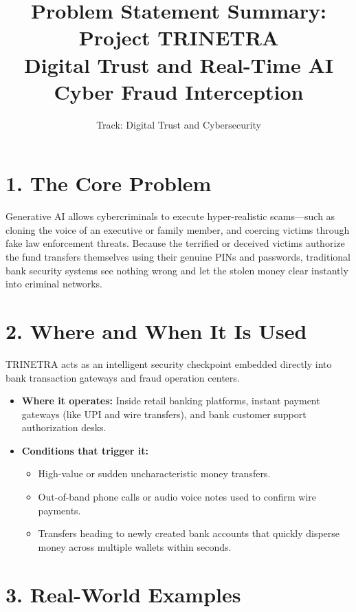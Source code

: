\documentclass[11pt,a4paper]{article}
\title{\textbf{Problem Statement Summary: Project TRINETRA}\\\large Digital Trust and Real-Time AI Cyber Fraud Interception}
\author{Track: Digital Trust and Cybersecurity}
\date{}
\begin{document}
\maketitle

\section*{1. The Core Problem}
Generative AI allows cybercriminals to execute hyper-realistic scams—such as cloning the voice of an executive or family member, and coercing victims through fake law enforcement threats. Because the terrified or deceived victims authorize the fund transfers themselves using their genuine PINs and passwords, traditional bank security systems see nothing wrong and let the stolen money clear instantly into criminal networks.

\section*{2. Where and When It Is Used}
TRINETRA acts as an intelligent security checkpoint embedded directly into bank transaction gateways and fraud operation centers.

\begin{itemize}[leftmargin=*]
    \item \textbf{Where it operates:} Inside retail banking platforms, instant payment gateways (like UPI and wire transfers), and bank customer support authorization desks.
    \item \textbf{Conditions that trigger it:}
    \begin{itemize}
        \item High-value or sudden uncharacteristic money transfers.
        \item Out-of-band phone calls or audio voice notes used to confirm wire payments.
        \item Transfers heading to newly created bank accounts that quickly disperse money across multiple wallets within seconds.
    \end{itemize}
\end{itemize}

\section*{3. Real-World Examples}
\end{document}

